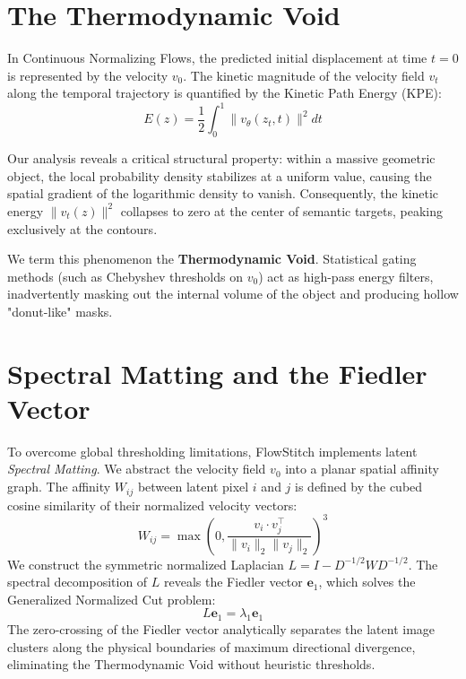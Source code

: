 \documentclass[12pt,a4paper]{report}
\begin{document}
\section{The Thermodynamic Void}
In Continuous Normalizing Flows, the predicted initial displacement at time $t=0$ is represented by the velocity $v_0$. The kinetic magnitude of the velocity field $v_t$ along the temporal trajectory is quantified by the Kinetic Path Energy (KPE):
\begin{equation}
    E(z) = \frac{1}{2} \int_0^1 \|v_\theta(z_t, t)\|^2 dt
\end{equation}

Our analysis reveals a critical structural property: within a massive geometric object, the local probability density stabilizes at a uniform value, causing the spatial gradient of the logarithmic density to vanish. Consequently, the kinetic energy $\|v_t(z)\|^2$ collapses to zero at the center of semantic targets, peaking exclusively at the contours. 

We term this phenomenon the \textbf{Thermodynamic Void}. Statistical gating methods (such as Chebyshev thresholds on $v_0$) act as high-pass energy filters, inadvertently masking out the internal volume of the object and producing hollow "donut-like" masks.

\section{Spectral Matting and the Fiedler Vector}
To overcome global thresholding limitations, FlowStitch implements latent \textit{Spectral Matting}. We abstract the velocity field $v_0$ into a planar spatial affinity graph. The affinity $W_{ij}$ between latent pixel $i$ and $j$ is defined by the cubed cosine similarity of their normalized velocity vectors:
\begin{equation}
    W_{ij} = \max\left( 0, \frac{v_i \cdot v_j^\top}{\|v_i\|_2 \|v_j\|_2} \right)^3
\end{equation}
We construct the symmetric normalized Laplacian $L = I - D^{-1/2} W D^{-1/2}$. The spectral decomposition of $L$ reveals the Fiedler vector $\mathbf{e}_1$, which solves the Generalized Normalized Cut problem:
\begin{equation}
    L \mathbf{e}_1 = \lambda_1 \mathbf{e}_1
\end{equation}
The zero-crossing of the Fiedler vector analytically separates the latent image clusters along the physical boundaries of maximum directional divergence, eliminating the Thermodynamic Void without heuristic thresholds.
\end{document}
